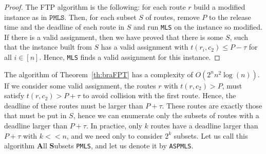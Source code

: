 \documentclass[a4paper,10pt]{journal}
\newcommand\MLS{\texttt{MLS}\xspace}
\newcommand\PMLS{\texttt{PMLS}\xspace}
\newcommand\ASPMLS{\texttt{ASPMLS}\xspace}
\begin{document}
\begin{proof}
The FTP algorithm is the following: for each route $r$ build a modified instance as in $\PMLS$.
Then, for each subset $S$ of routes, remove $P$ to the release time and the deadline of each route in $S$ and run \MLS on the instance so modified. If there is a valid assignment, then we have proved that there is some $S$, such that the instance built from $S$ has a valid assignment with $t(r_i,c_2) \leq P - \tau$ for all $i\in [n]$. Hence, \MLS finds a valid assignment for this instance.
\end{proof}

The algorithm of Theorem~\ref{th:braFPT} has a complexity of $O(2^nn^2\log(n))$. If we consider some valid assignment, the routes $r$ with $t(r,c_2) > P$, must satisfy $t(r,c_2) > P + \tau$ to avoid collision with the first route. Hence, the deadline of these routes must be larger than $P + \tau$. These routes are exactly those that must be put in $S$, hence we can enumerate only the subsets of routes with a deadline larger than $P + \tau$. In practice, only $k$ routes have a deadline larger than $P + \tau$ with $k << n$, and we need only to consider $2^k$ subsets. Let us call this algorithm \textbf{A}ll \textbf{S}ubsets \PMLS, and let us denote it by \ASPMLS.
\end{document}
